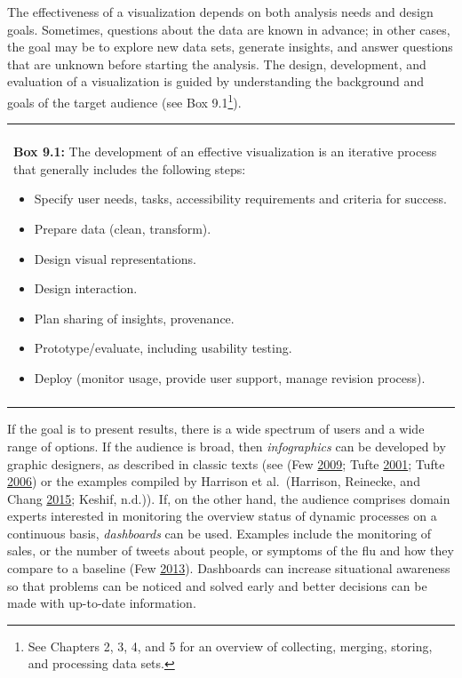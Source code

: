 \documentclass[]{krantz}
\newenvironment{F00}
    {\begin{center}
    \begin{tabular}{|p{0.9\textwidth}|}
    \hline\\
    }
    { 
    \\\\\hline
    \end{tabular} 
    \end{center}
    }
\begin{document}
The effectiveness of a visualization depends on both analysis needs and
design goals. Sometimes, questions about the data are known in advance;
in other cases, the goal may be to explore new data sets, generate
insights, and answer questions that are unknown before starting the
analysis. The design, development, and evaluation of a visualization is
guided by understanding the background and goals of the target audience
(see Box 9.1\footnote{See Chapters 2, 3, 4, and 5 for an overview of
  collecting, merging, storing, and processing data sets.}).

\begin{F00}
\textbf{Box 9.1:} The development of an effective visualization is an
iterative process that generally includes the following steps:

\begin{itemize}
\item
  Specify user needs, tasks, accessibility requirements and criteria for
  success.
\item
  Prepare data (clean, transform).
\item
  Design visual representations.
\item
  Design interaction.
\item
  Plan sharing of insights, provenance.
\item
  Prototype/evaluate, including usability testing.
\item
  Deploy (monitor usage, provide user support, manage revision process).
\end{itemize}
\end{F00}

If the goal is to present results, there is a wide spectrum of users and
a wide range of options. If the audience is broad, then
\emph{infographics} can be developed by graphic designers, as described
in classic texts (see (Few \protect\hyperlink{ref-few2009now}{2009};
Tufte \protect\hyperlink{ref-edward2001visual}{2001}; Tufte
\protect\hyperlink{ref-edward2006beauty}{2006}) or the examples compiled
by Harrison et al.~(Harrison, Reinecke, and Chang
\protect\hyperlink{ref-harrison2015infographic}{2015}; Keshif, n.d.)).
If, on the other hand, the audience comprises domain experts interested
in monitoring the overview status of dynamic processes on a continuous
basis, \emph{dashboards} can be used. Examples include the monitoring of
sales, or the number of tweets about people, or symptoms of the flu and
how they compare to a baseline (Few
\protect\hyperlink{ref-few2013information}{2013}). Dashboards can
increase situational awareness so that problems can be noticed and
solved early and better decisions can be made with up-to-date
information.
\end{document}
